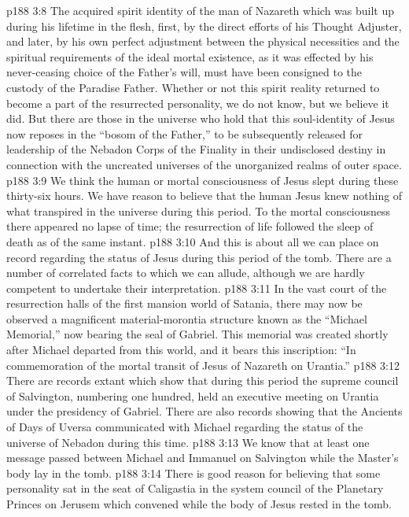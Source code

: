 \pc \vs p188 3:8 \bibnobreakspace The acquired spirit identity of the man of Nazareth which was built up during his lifetime in the flesh, first, by the direct efforts of his Thought Adjuster, and later, by his own perfect adjustment between the physical necessities and the spiritual requirements of the ideal mortal existence, as it was effected by his never\hyp{}ceasing choice of the Father’s will, must have been consigned to the custody of the Paradise Father. Whether or not this spirit reality returned to become a part of the resurrected personality, we do not know, but we believe it did. But there are those in the universe who hold that this soul\hyp{}identity of Jesus now reposes in the “bosom of the Father,” to be subsequently released for leadership of the Nebadon Corps of the Finality in their undisclosed destiny in connection with the uncreated universes of the unorganized realms of outer space.
\pc \vs p188 3:9 \bibnobreakspace We think the human or mortal consciousness of Jesus slept during these thirty\hyp{}six hours. We have reason to believe that the human Jesus knew nothing of what transpired in the universe during this period. To the mortal consciousness there appeared no lapse of time; the resurrection of life followed the sleep of death as of the same instant.
\pc \vs p188 3:10 And this is about all we can place on record regarding the status of Jesus during this period of the tomb. There are a number of correlated facts to which we can allude, although we are hardly competent to undertake their interpretation.
\vs p188 3:11 In the vast court of the resurrection halls of the first mansion world of Satania, there may now be observed a magnificent material\hyp{}morontia structure known as the “Michael Memorial,” now bearing the seal of Gabriel. This memorial was created shortly after Michael departed from this world, and it bears this inscription: “In commemoration of the mortal transit of Jesus of Nazareth on Urantia.”\plusone
\vs p188 3:12 There are records extant which show that during this period the supreme council of Salvington, numbering one hundred, held an executive meeting on Urantia under the presidency of Gabriel. There are also records showing that the Ancients of Days of Uversa communicated with Michael regarding the status of the universe of Nebadon during this time.
\vs p188 3:13 We know that at least one message passed between Michael and Immanuel on Salvington while the Master’s body lay in the tomb.
\vs p188 3:14 There is good reason for believing that some personality sat in the seat of Caligastia in the system council of the Planetary Princes on Jerusem which convened while the body of Jesus rested in the tomb.
